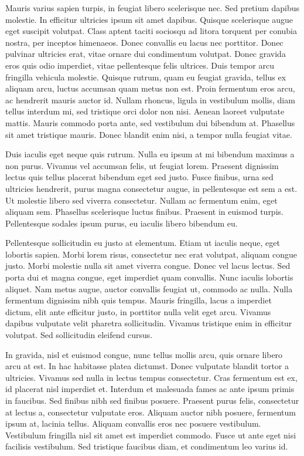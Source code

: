 \documentclass[12pt]{article}
\begin{document}
Mauris varius sapien turpis, in feugiat libero scelerisque nec. Sed pretium dapibus molestie. In efficitur ultricies ipsum sit amet dapibus. Quisque scelerisque augue eget suscipit volutpat. Class aptent taciti sociosqu ad litora torquent per conubia nostra, per inceptos himenaeos. Donec convallis eu lacus nec porttitor. Donec pulvinar ultricies erat, vitae ornare dui condimentum volutpat. Donec gravida eros quis odio imperdiet, vitae pellentesque felis ultrices. Duis tempor arcu fringilla vehicula molestie. Quisque rutrum, quam eu feugiat gravida, tellus ex aliquam arcu, luctus accumsan quam metus non est. Proin fermentum eros arcu, ac hendrerit mauris auctor id. Nullam rhoncus, ligula in vestibulum mollis, diam tellus interdum mi, sed tristique orci dolor non nisi. Aenean laoreet vulputate mattis. Mauris commodo porta ante, sed vestibulum dui bibendum at. Phasellus sit amet tristique mauris. Donec blandit enim nisi, a tempor nulla feugiat vitae.

Duis iaculis eget neque quis rutrum. Nulla eu ipsum at mi bibendum maximus a non purus. Vivamus vel accumsan felis, ut feugiat lorem. Praesent dignissim lectus quis tellus placerat bibendum eget sed justo. Fusce finibus, urna sed ultricies hendrerit, purus magna consectetur augue, in pellentesque est sem a est. Ut molestie libero sed viverra consectetur. Nullam ac fermentum enim, eget aliquam sem. Phasellus scelerisque luctus finibus. Praesent in euismod turpis. Pellentesque sodales ipsum purus, eu iaculis libero bibendum eu.

Pellentesque sollicitudin eu justo at elementum. Etiam ut iaculis neque, eget lobortis sapien. Morbi lorem risus, consectetur nec erat volutpat, aliquam congue justo. Morbi molestie nulla sit amet viverra congue. Donec vel lacus lectus. Sed porta dui et magna congue, eget imperdiet quam convallis. Nunc iaculis lobortis aliquet. Nam metus augue, auctor convallis feugiat ut, commodo ac nulla. Nulla fermentum dignissim nibh quis tempus. Mauris fringilla, lacus a imperdiet dictum, elit ante efficitur justo, in porttitor nulla velit eget arcu. Vivamus dapibus vulputate velit pharetra sollicitudin. Vivamus tristique enim in efficitur volutpat. Sed sollicitudin eleifend cursus.

In gravida, nisl et euismod congue, nunc tellus mollis arcu, quis ornare libero arcu at est. In hac habitasse platea dictumst. Donec vulputate blandit tortor a ultricies. Vivamus sed nulla in lectus tempus consectetur. Cras fermentum est ex, id placerat nisl imperdiet et. Interdum et malesuada fames ac ante ipsum primis in faucibus. Sed finibus nibh sed finibus posuere. Praesent purus felis, consectetur at lectus a, consectetur vulputate eros. Aliquam auctor nibh posuere, fermentum ipsum at, lacinia tellus. Aliquam convallis eros nec posuere vestibulum. Vestibulum fringilla nisl sit amet est imperdiet commodo. Fusce ut ante eget nisi facilisis vestibulum. Sed tristique faucibus diam, et condimentum leo varius id.
\end{document}
